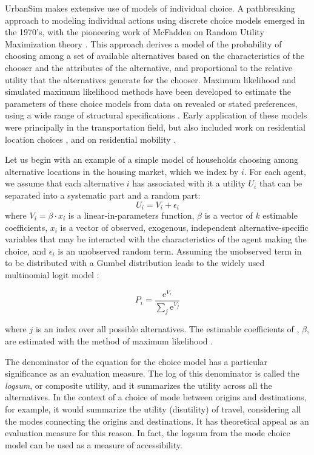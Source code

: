 UrbanSim makes extensive use of models of individual choice.  
A pathbreaking approach to modeling individual actions using discrete
choice models emerged in the 1970's, with the pioneering work of
McFadden on Random Utility Maximization theory
\citep{mcfadden-1974,mcfadden-1981}. This approach derives a model of
the probability of choosing among a set of available alternatives
based on the characteristics of the chooser and the attributes of
the alternative, and proportional to the relative utility that the
alternatives generate for the chooser. Maximum likelihood and
simulated maximum likelihood methods have been developed to estimate
the parameters of these choice models from data on revealed or
stated preferences, using a wide range of structural specifications
\citep{train-book-2003}. Early application of these models were
principally in the transportation field, but also included work on
residential location choices
\citep{quigley-eer-1976,lerman-trr-1977,mcfadden-1978}, and
on residential mobility \citep{clark-vanlierop-1986}.

Let us begin with an example of a simple model of households choosing among
alternative locations in the housing market, which we index by
$i$. For each agent, we assume that each alternative $i$ has
associated with it a utility $U_i$ that can be separated into a
systematic part and a random part:
\begin{equation}
    U_i = V_i + \epsilon_i
    \label{eq:utility}
\end{equation}
where $V_i = \beta\cdot {x}_i$ is a linear-in-parameters
function, $\beta$ is a vector of $k$ estimable coefficients,
$x_i$ is a vector of observed, exogenous, independent
alternative-specific variables that may be interacted with the
characteristics of the agent making the choice, and $\epsilon_i$
is an unobserved random term. Assuming the unobserved term in  to be distributed with a Gumbel distribution
leads to the  widely used multinomial logit model \citep{mcfadden-1974,mcfadden-1981}:

\begin{equation} \label{eq:mnl}
    P_i = \frac{\mathrm{e}^{V_i}}{\sum_j \mathrm{e}^{V_j}}
\end{equation}

where $j$ is an index over all possible alternatives. The estimable coefficients of , $\beta$, are estimated with the method of maximum likelihood \citep{greene-2002}.

The denominator of the equation for the choice model has a particular
significance as an evaluation measure.  The log of this denominator
is called the \emph{logsum}, or composite utility, and it summarizes
the utility across all the alternatives.  In the context of a choice of
mode between origins and destinations, for example, it would summarize
the utility (disutility) of travel, considering all the modes connecting the
origins and destinations.  It has theoretical appeal as an evaluation
measure for this reason.  In fact, the logsum from the mode choice
model can be used as a measure of accessibility.

